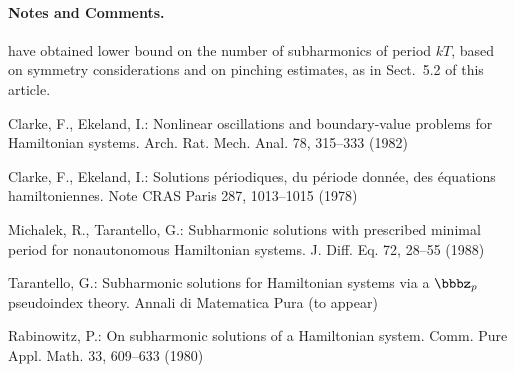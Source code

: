 \documentclass{llncs}
\begin{document}
\paragraph{Notes and Comments.}

have obtained lower bound on the number of subharmonics of period $kT$,
based on symmetry considerations and on pinching estimates, as in
Sect.~5.2 of this article.


%
%
\begin{thebibliography}{5}
%
Clarke, F., Ekeland, I.:
Nonlinear oscillations and
boundary-value problems for Hamiltonian systems.
Arch. Rat. Mech. Anal. 78, 315--333 (1982)

Clarke, F., Ekeland, I.:
Solutions p\'{e}riodiques, du
p\'{e}riode donn\'{e}e, des \'{e}quations hamiltoniennes.
Note CRAS Paris 287, 1013--1015 (1978)

Michalek, R., Tarantello, G.:
Subharmonic solutions with prescribed minimal
period for nonautonomous Hamiltonian systems.
J. Diff. Eq. 72, 28--55 (1988)

Tarantello, G.:
Subharmonic solutions for Hamiltonian
systems via a $\bbbz_{p}$ pseudoindex theory.
Annali di Matematica Pura (to appear)

Rabinowitz, P.:
On subharmonic solutions of a Hamiltonian system.
Comm. Pure Appl. Math. 33, 609--633 (1980)

\end{thebibliography}
\end{document}
